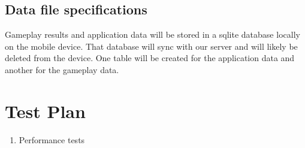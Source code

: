 \documentclass[a4wide]{article}
\begin{document}
\subsection{Data file specifications}

Gameplay results and application data will be stored in a sqlite database locally on the mobile device.  That database will sync with our server and will likely be deleted from the device.  One table will be created for the application data and another for the gameplay data.


\section{Test Plan}
\begin{enumerate}
\item Performance tests
\begin{enumerate}



\end{enumerate}
\end{enumerate}
\end{document}
